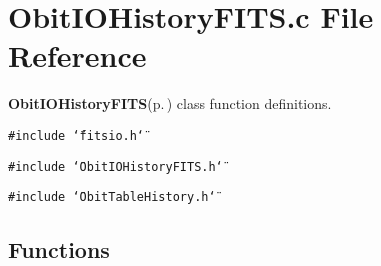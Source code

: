 \section{Obit\-IOHistory\-FITS.c File Reference}
\label{ObitIOHistoryFITS_8c}
{\bf Obit\-IOHistory\-FITS}{\rm (p.\,\pageref{structObitIOHistoryFITS})} class function definitions. 

{\tt \#include \char`\"{}fitsio.h\char`\"{}}\par
{\tt \#include \char`\"{}Obit\-IOHistory\-FITS.h\char`\"{}}\par
{\tt \#include \char`\"{}Obit\-Table\-History.h\char`\"{}}\par
\subsection*{Functions}
